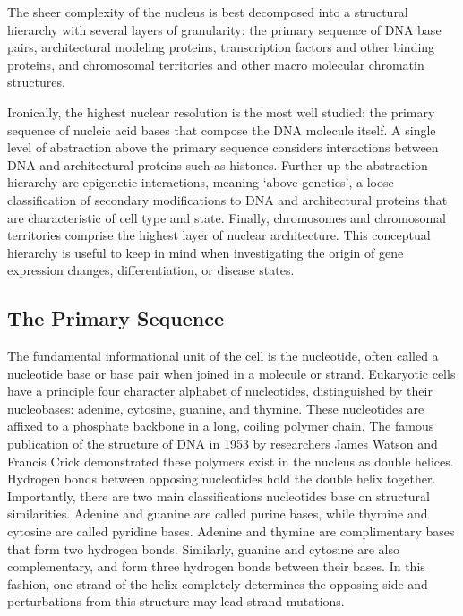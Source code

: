 The sheer complexity of the nucleus is best decomposed into a structural hierarchy with several layers of granularity: the primary
sequence of \gls{DNA} base pairs, architectural modeling proteins, transcription factors and other binding proteins, and \gls{chromosomal
  territories} and other macro molecular chromatin structures.

Ironically, the highest nuclear resolution is the most well studied: the primary sequence of nucleic acid bases that compose the \gls{DNA}
molecule itself.  A single level of abstraction above the primary sequence considers interactions between \gls{DNA} and  architectural
proteins such as histones.  Further up the abstraction hierarchy are \gls{epigenetic} interactions, meaning `above genetics'\cite{dictepi2014},
a loose classification of secondary modifications to \gls{DNA} and architectural proteins that are characteristic of cell type and state.
Finally, chromosomes and chromosomal territories comprise the highest layer of nuclear architecture.  This conceptual hierarchy is useful
to keep in mind when investigating the origin of gene expression changes, differentiation, or disease states.

\subsection*{The Primary Sequence}

The fundamental informational unit of the cell is the \gls{nucleotide}, often called a nucleotide base or base pair when joined in a
molecule or strand.  Eukaryotic cells have a principle four character alphabet of nucleotides, distinguished by their \gls{nucleobases}:
adenine, cytosine, guanine, and thymine.  These nucleotides are affixed to a phosphate backbone in a long, coiling polymer chain.  The
famous publication of the structure of \gls{DNA} in 1953 by researchers James Watson and Francis Crick demonstrated these polymers
exist in the nucleus as double helices\cite{watson1953}.  Hydrogen bonds between opposing nucleotides hold the double helix together.
Importantly, there are two main classifications nucleotides base on structural similarities.  Adenine and guanine are called purine bases,
while thymine and cytosine are called pyridine bases.  Adenine and thymine are complimentary bases that form two hydrogen bonds.  Similarly,
guanine and cytosine are also complementary, and form three hydrogen bonds between their bases.  In this fashion, one strand of the helix completely
determines the opposing side and perturbations from this structure may lead strand mutations\cite{cox2008}.

